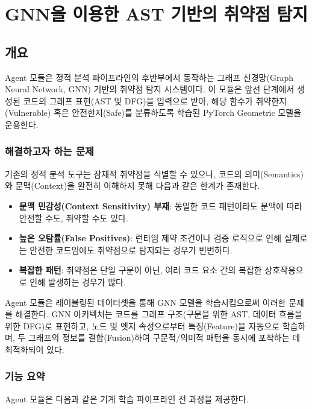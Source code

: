 \clearpage

\section{GNN을 이용한 AST 기반의 취약점 탐지}

\subsection{개요}
Agent 모듈은 정적 분석 파이프라인의 후반부에서 동작하는 그래프 신경망(Graph Neural Network, GNN) 기반의 취약점 탐지 시스템이다. 이 모듈은 앞선 단계에서 생성된 코드의 그래프 표현(AST 및 DFG)을 입력으로 받아, 해당 함수가 취약한지(Vulnerable) 혹은 안전한지(Safe)를 분류하도록 학습된 PyTorch Geometric 모델을 운용한다.

\subsubsection{해결하고자 하는 문제}
기존의 정적 분석 도구는 잠재적 취약점을 식별할 수 있으나, 코드의 의미(Semantics)와 문맥(Context)을 완전히 이해하지 못해 다음과 같은 한계가 존재한다.

\begin{itemize}
    \item \textbf{문맥 민감성(Context Sensitivity) 부재}: 동일한 코드 패턴이라도 문맥에 따라 안전할 수도, 취약할 수도 있다.
    \item \textbf{높은 오탐률(False Positives)}: 런타임 제약 조건이나 검증 로직으로 인해 실제로는 안전한 코드임에도 취약점으로 탐지되는 경우가 빈번하다.
    \item \textbf{복잡한 패턴}: 취약점은 단일 구문이 아닌, 여러 코드 요소 간의 복잡한 상호작용으로 인해 발생하는 경우가 많다.
\end{itemize}

Agent 모듈은 레이블링된 데이터셋을 통해 GNN 모델을 학습시킴으로써 이러한 문제를 해결한다. GNN 아키텍처는 코드를 그래프 구조(구문을 위한 AST, 데이터 흐름을 위한 DFG)로 표현하고, 노드 및 엣지 속성으로부터 특징(Feature)을 자동으로 학습하며, 두 그래프의 정보를 결합(Fusion)하여 구문적/의미적 패턴을 동시에 포착하는 데 최적화되어 있다.


\subsubsection{기능 요약}
Agent 모듈은 다음과 같은 기계 학습 파이프라인 전 과정을 제공한다.

